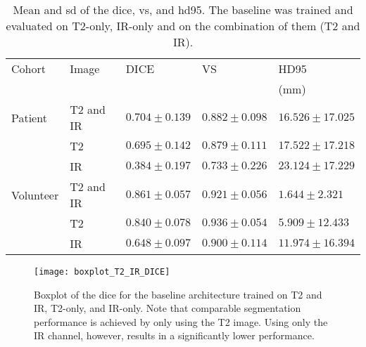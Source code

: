 \begin{table}[htbp]
   \centering
   \caption[Results for Feasibility]{Mean and \gls{sd} of the \acrlong{dice}, \acrlong{vs}, and \acrlong{hd95}. The baseline was trained and evaluated on T2-only, IR-only and on the combination of them (T2 and IR).}
   \begin{tabular}{l*{4}{l}}
      \toprule
      Cohort	& Image  & DICE              & VS				& HD95\\
      			&			&					&					& (mm)\\
      \midrule
      Patient   & T2 and IR & $\mathbf{0.704 \pm 0.139}$& $\mathbf{0.882 \pm 0.098}$ & $\mathbf{16.526 \pm 17.025}$ \\
                & T2        & $0.695 \pm 0.142 $& $0.879 \pm 0.111$ & $ 17.522 \pm 17.218$ \\
                & IR        & $0.384 \pm 0.197 $& $0.733 \pm 0.226$ & $ 23.124 \pm 17.229$ \\
      \midrule
      Volunteer & T2 and IR & $\mathbf{0.861 \pm 0.057 }$& $0.921 \pm 0.056$ & $\mathbf{1.644 \pm 2.321}$ \\
                & T2        & $0.840 \pm 0.078 $& $\mathbf{0.936 \pm 0.054}$ & $ 5.909 \pm 12.433$ \\
                & IR        & $0.648 \pm 0.097 $& $0.900 \pm 0.114$ & $ 11.974 \pm 16.394$ \\
      \bottomrule
   \end{tabular}
   \label{tab:results_feasibility}
\end{table}

\begin{figure}[htbp]
	\centering
	\texttt{[image: boxplot\_T2\_IR\_DICE]}
    \caption[Boxplot of the \glsdesc{dice} for Feasibility]{Boxplot of the \acrlong{dice} for the baseline architecture trained on T2 and IR, T2-only, and IR-only. Note that comparable segmentation performance is achieved by only using the T2 image. Using only the IR channel, however, results in a significantly lower performance.}
    \label{fig:results_boxplot_T2_IR_dice}
\end{figure}

